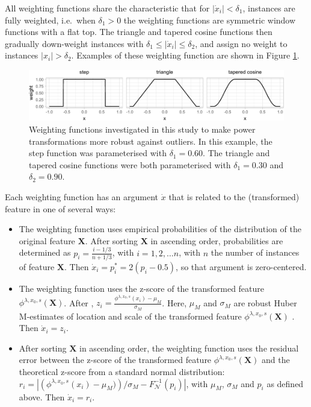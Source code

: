 \documentclass[preprint,12pt,authoryear]{elsarticle}
\begin{document}
All weighting functions share the characteristic that for
\(\left| \dot{x}_i \right|< \delta_1\), instances are fully weighted,
i.e.~when \(\delta_1 > 0\) the weighting functions are symmetric window
functions with a flat top. The triangle and tapered cosine functions
then gradually down-weight instances with
\(\delta_1 \leq \left| \dot{x}_i \right| \leq \delta_2\), and assign no
weight to instances \(\left| x_i \right| > \delta_2\). Examples of these
weighting function are shown in Figure \ref{fig:weighting-functions}.

\begin{figure}

{\centering \includegraphics[width=1\linewidth]{figure_2} 

}

\caption{Weighting functions investigated in this study to make power transformations more robust against outliers. In this example, the step function was parameterised with $\delta_1 = 0.60$. The triangle and tapered cosine functions were both parameterised with $\delta_1 = 0.30$ and $\delta_2 = 0.90$.}\label{fig:weighting-functions}
\end{figure}

Each weighting function has an argument \(\dot{x}\) that is related to
the (transformed) feature in one of several ways:

\begin{itemize}
\item
  The weighting function uses empirical probabilities of the
  distribution of the original feature \(\mathbf{X}\). After sorting
  \(\mathbf{X}\) in ascending order, probabilities are determined as
  \(p_i = \frac{i - 1/3}{n + 1/3}\), with \(i = 1, 2, \ldots n\), with
  \(n\) the number of instances of feature \(\mathbf{X}\). Then
  \(\dot{x}_i = p^{*}_i=2 \left( p_i - 0.5\right)\), so that argument is
  zero-centered.
\item
  The weighting function uses the z-score of the transformed feature
  \(\phi^{\lambda, x_0, s} (\mathbf{X})\). After \citep{Raymaekers2024-zf},
  \(z_i = \frac{\phi^{\lambda, x_0, s}(x_i) - \mu_M}{\sigma_M}\). Here,
  \(\mu_M\) and \(\sigma_M\) are robust Huber M-estimates of location
  and scale of the transformed feature
  \(\phi^{\lambda, x_0, s} (\mathbf{X})\) \citep{Huber1981-su}. Then
  \(\dot{x}_i = z_i\).
\item
  After sorting \(\mathbf{X}\) in ascending order, the weighting
  function uses the residual error between the z-score of the
  transformed feature \(\phi^{\lambda, x_0, s} (\mathbf{X})\) and the
  theoretical z-score from a standard normal distribution:
  \(r_i =\left| \left( \phi^{\lambda, x_0, s}(x_i) - \mu_M)\right) / \sigma_M - F^{-1}_{\mathcal{N}}(p_i) \right|\),
  with \(\mu_M\), \(\sigma_M\) and \(p_i\) as defined above. Then
  \(\dot{x}_i = r_i\).
\end{itemize}
\end{document}
